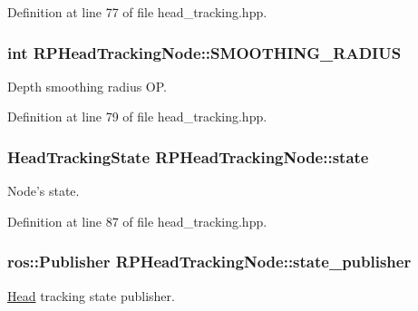 \-Definition at line 77 of file head\-\_\-tracking.\-hpp.

\hypertarget{class_r_p_head_tracking_node_a0735dfefd230deabd81cc96d145205ed}{
\subsubsection[{\-S\-M\-O\-O\-T\-H\-I\-N\-G\-\_\-\-R\-A\-D\-I\-U\-S}]{\setlength{\rightskip}{0pt plus 5cm}int {\bf \-R\-P\-Head\-Tracking\-Node\-::\-S\-M\-O\-O\-T\-H\-I\-N\-G\-\_\-\-R\-A\-D\-I\-U\-S}}}\label{class_r_p_head_tracking_node_a0735dfefd230deabd81cc96d145205ed}
\-Depth smoothing radius \-O\-P. 

\-Definition at line 79 of file head\-\_\-tracking.\-hpp.

\hypertarget{class_r_p_head_tracking_node_abb89a5e3747c9ce5c046381c2e02b226}{
\subsubsection[{state}]{\setlength{\rightskip}{0pt plus 5cm}\-Head\-Tracking\-State {\bf \-R\-P\-Head\-Tracking\-Node\-::state}}}\label{class_r_p_head_tracking_node_abb89a5e3747c9ce5c046381c2e02b226}
\-Node's state. 

\-Definition at line 87 of file head\-\_\-tracking.\-hpp.

\hypertarget{class_r_p_head_tracking_node_a2d99f169c031cc19c178c74b462c8c43}{
\subsubsection[{state\-\_\-publisher}]{\setlength{\rightskip}{0pt plus 5cm}ros\-::\-Publisher {\bf \-R\-P\-Head\-Tracking\-Node\-::state\-\_\-publisher}}}\label{class_r_p_head_tracking_node_a2d99f169c031cc19c178c74b462c8c43}
\hyperlink{struct_head}{\-Head} tracking state publisher. 

